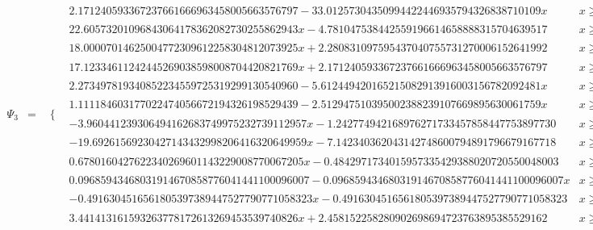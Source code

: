 \documentclass{article}
\begin{document}
\begin{landscape}
\begin{eqnarray*}
\begin{array}{cc}
\end{array}\\
\Psi_3 & = & \begin{array}{cc}
 \{ & 
\begin{array}{cc}
 2.171240593367237661666963458005663576797-33.01257304350994422446935794326838710109 x & x\geq 0\land x<\frac{1}{8} \\
 22.60573201096843064178362082730255862943 x-4.781047538442559196614658888315704639517 & x\geq \frac{1}{8}\land x<\frac{1}{4} \\
 18.00007014625004772309612258304812073925 x+2.280831097595437040755731270006152641992 & x\geq -\frac{1}{4}\land x<-\frac{1}{8} \\
 17.12334611242445269038598008704420821769 x+2.171240593367237661666963458005663576797 & x\geq -\frac{1}{8}\land x<0 \\
 2.273497819340852234559725319299130540960-5.612449420165215082913916003156782092481 x & x\geq \frac{1}{4}\land x<\frac{3}{8} \\
 1.111184603177022474056672194326198529439-2.512947510395002388239107669895630061759 x & x\geq \frac{3}{8}\land x<\frac{1}{2} \\
 -3.960441239306494162683749975232739112957 x-1.242774942168976271733457858447753897730 & x\geq -\frac{1}{2}\land x<-\frac{3}{8} \\
 -19.69261569230427143432998206416320649959 x-7.142340362043142748600794891796679167718 & x\geq -\frac{3}{8}\land x<-\frac{1}{4} \\
 0.6780160427622340269601143229008770067205 x-0.4842971734015957335429388020720550048003 & x\geq \frac{1}{2}\land x<\frac{3}{4} \\
 0.09685943468031914670858776041441100096007-0.09685943468031914670858776041441100096007 x & x\geq \frac{3}{4}\land x<1 \\
 -0.4916304516561805397389447527790771058323 x-0.4916304516561805397389447527790771058323 & x\geq -1\land x<-\frac{3}{4} \\
 3.441413161593263778172613269453539740826 x+2.458152258280902698694723763895385529162 & x\geq -\frac{3}{4}\land x<-\frac{1}{2}
\end{array}

\end{array}\end{eqnarray*}
\end{landscape}
\end{document}
